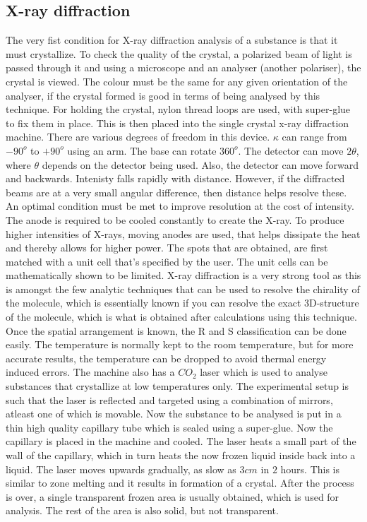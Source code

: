 	\subsection{X-ray diffraction}
		The very fist condition for X-ray diffraction analysis of a substance is that it must crystallize. To check the quality of the crystal, a polarized beam of light is passed through it and using a microscope and an analyser (another polariser), the crystal is viewed. The colour must be the same for any given orientation of the analyser, if the crystal formed is good in terms of being analysed by this technique.
		For holding the crystal, nylon thread loops are used, with super-glue to fix them in place. This is then placed into the single crystal x-ray diffraction machine. There are various degrees of freedom in this device. $\kappa$ can range from $-90 ^o$ to $+90 ^o$ using an arm. The base can rotate $360 ^o$. The detector can move $2 \theta$, where $\theta$ depends on the detector being used. Also, the detector can move forward and backwards. Intenisty falls rapidly with distance. However, if the diffracted beams are at a very small angular difference, then distance helps resolve these. An optimal condition must be met to improve resolution at the cost of intensity. 
		The anode is required to be cooled constantly to create the X-ray. To produce higher intensities of X-rays, moving anodes are used, that helps dissipate the heat and thereby allows for higher power.
		The spots that are obtained, are first matched with a unit cell that's specified by the user. The unit cells can be mathematically shown to be limited.
		X-ray diffraction is a very strong tool as this is amongst the few analytic techniques that can be used to resolve the chirality of the molecule, which is essentially known if you can resolve the exact 3D-structure of the molecule, which is what is obtained after calculations using this technique. Once the spatial arrangement is known, the R and S classification can be done easily.
		The temperature is normally kept to the room temperature, but for more accurate results, the temperature can be dropped to avoid thermal energy induced errors.
		The machine also has a $CO_2$ laser which is used to analyse substances that crystallize at low temperatures only. The experimental setup is such that the laser is reflected and targeted using a combination of mirrors, atleast one of which is movable. Now the substance to be analysed is put in a thin high quality capillary tube which is sealed using a super-glue. Now the capillary is placed in the machine and cooled. The laser heats a small part of the wall of the capillary, which in turn heats the now frozen liquid inside back into a liquid. The laser moves upwards gradually, as slow as $3 cm$ in $2$ hours. This is similar to zone melting and it results in formation of a crystal. After the process is over, a single transparent frozen area is usually obtained, which is used for analysis. The rest of the area is also solid, but not transparent.
